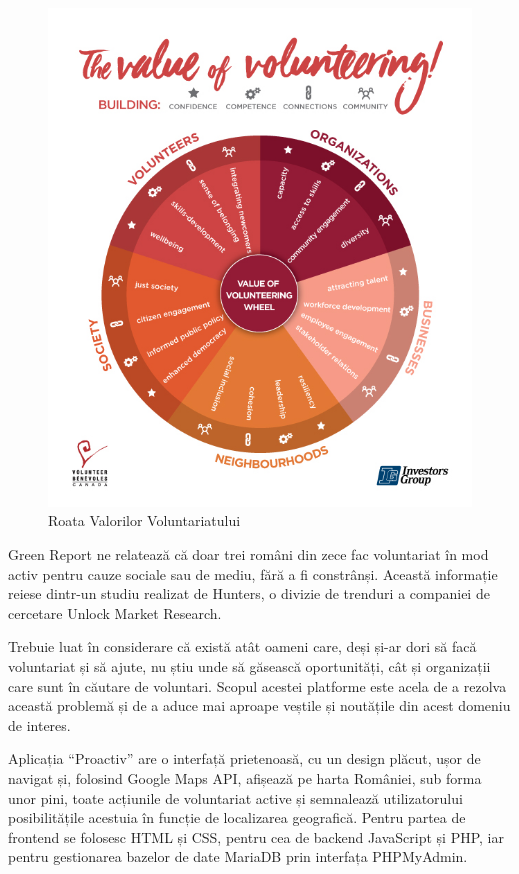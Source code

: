 \documentclass[12pt,a4paper]{report}
\begin{document}
\begin{figure}[H]
\centering
  \includegraphics[width=0.7\linewidth]{./imagini/VC_ValueOfVolunteering.jpg}
  \caption{Roata Valorilor Voluntariatului}
\end{figure}

\par
Green Report\cite{greenr} ne relatează că doar trei români din zece fac voluntariat în mod activ pentru cauze sociale sau de mediu, fără a fi constrânși. Această informație reiese dintr-un studiu realizat de Hunters, o divizie de trenduri a companiei de cercetare Unlock Market Research.
\\ \par
Trebuie luat în considerare că există atât oameni care, deși și-ar dori să facă voluntariat și să ajute, nu știu unde să găsească oportunități, cât și organizații care sunt în căutare de voluntari. Scopul acestei platforme este acela de a rezolva această problemă și de a aduce mai aproape veștile și noutățile din acest domeniu de interes.
\\ \par
Aplicația “Proactiv” are o interfață prietenoasă, cu un design plăcut, ușor de navigat și, folosind Google Maps API, afișează pe harta României, sub forma unor pini, toate acțiunile de voluntariat active și semnalează utilizatorului posibilitățile acestuia în funcție de localizarea geografică. Pentru partea de frontend se folosesc HTML și CSS, pentru cea de backend JavaScript și PHP, iar pentru gestionarea bazelor de date MariaDB prin interfața PHPMyAdmin.
\end{document}
